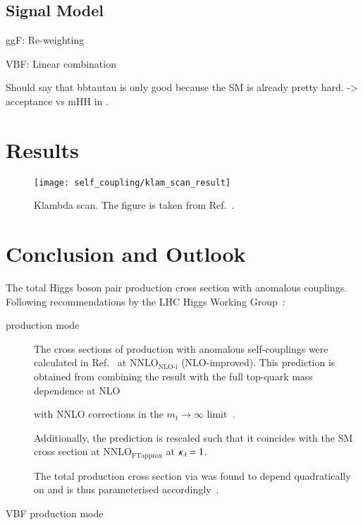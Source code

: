 

\subsection{Signal Model}


ggF: Re-weighting

VBF: Linear combination




Should say that bbtautau is only good because the SM is already pretty
hard. -> acceptance vs mHH in \hadhad.


\section{Results}%
\label{sec:reinterpretation_results}


\begin{figure}[htbp]
  \centering

  \texttt{[image: self\_coupling/klam\_scan\_result]}

  \caption{Klambda scan. The figure is taken from
    Ref.~\cite{ATLAS-CONF-2021-052}.}%
  \label{fig:klambda_scan}
\end{figure}


\section{Conclusion and Outlook}%
\label{sec:reinterpretation_conclusion}


The total Higgs boson pair production cross section with anomalous
couplings. Following recommendations by the LHC Higgs Working
Group~\cite{LHCHWGHH}:
\begin{description}

\item[\ggF production mode] The cross sections of \HH production with
  anomalous self-couplings were calculated in
  Ref.~\cite{Amoroso:2020lgh} at $\text{NNLO}_{\text{NLO-i}}$
  (NLO-improved). This prediction is obtained from combining the
  result with the full top-quark mass dependence at
  NLO~\cite{Buchalla:2018yce}


  with NNLO corrections in the $m_{t} \to \infty$
  limit~\cite{deFlorian:2017qfk}.

  Additionally, the prediction is rescaled such that it coincides with
  the SM \HH cross section at $\text{NNLO}_{\text{FTapprox}}$ at
  $\kappa_{\lambda} = 1$.

  The total \HH production cross section via \ggF was found to depend
  quadratically on \klambda and is thus parameterised
  accordingly~\cite{LHCHWGHH}.

\item[VBF production mode]

\end{description}


